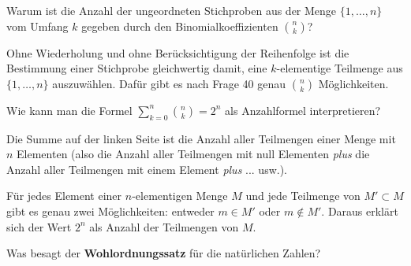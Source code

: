 \begin{frage}
  Warum ist die Anzahl der ungeordneten Stichproben aus der Menge 
  $\{1,\ldots,n\}$ vom Umfang $k$ gegeben durch den Binomialkoeffizienten 
  $\binom{n}{k}$?
\end{frage}

\begin{antwort}
  Ohne Wiederholung und ohne Berücksichtigung der Reihenfolge ist die Bestimmung 
  einer Stichprobe gleichwertig damit, eine $k$-elementige Teilmenge aus 
  $\{ 1,\ldots, n \}$ auszuwählen. 
  Dafür gibt es nach Frage 40 genau $\binom{n}{k}$ Möglichkeiten.
  \AntEnd
\end{antwort}






\begin{frage}
  Wie kann man die Formel $\sum_{k=0}^n \binom{n}{k} = 2^n$
  als Anzahlformel interpretieren?
\end{frage}

\begin{antwort}
  Die Summe auf der linken Seite ist die Anzahl aller Teilmengen einer 
  Menge mit $n$ Elementen (also die Anzahl aller Teilmengen mit null Elementen 
  \textit{plus} die Anzahl aller 
  Teilmengen mit einem Element \textit{plus} ... usw.). 

  Für jedes Element einer $n$-elementigen Menge $M$ und jede Teilmenge 
  von $M'\subset M$ gibt es genau zwei Möglichkeiten: entweder $m\in M'$ oder 
  $m\not\in M'$. Daraus erklärt sich der Wert $2^n$ als Anzahl der 
  Teilmengen von $M$.
  \AntEnd  
\end{antwort}






\begin{frage}
  \label{wohlordnungssatz}
  Was besagt der \textbf{Wohlordnungssatz} für die natürlichen Zahlen? 
\end{frage}

